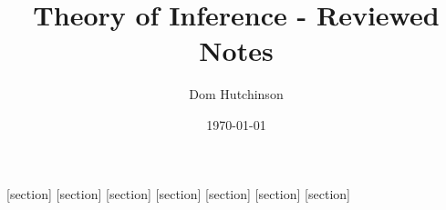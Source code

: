 \documentclass[11pt,a4paper]{article}
\begin{document}
\pagestyle{fancy}
\setlength\parindent{0pt}
\allowdisplaybreaks

\renewcommand{\headrulewidth}{0pt}

\renewcommand{\thefootnote}{[\arabic{footnote}]}


\title{Theory of Inference - Reviewed Notes}
\author{Dom Hutchinson}
\date{\today}
\maketitle

\fancyhead[R]{\today}

[section]
[section]
[section]
[section]
[section]
[section]
[section]

\newcommand{\dotprod}[0]{\boldsymbol{\cdot}}
\newcommand{\cosech}[0]{\mathrm{cosech}\ }
\newcommand{\cosec}[0]{\mathrm{cosec}\ }
\newcommand{\sech}[0]{\mathrm{sech}\ }
\newcommand{\prob}[0]{\mathbb{P}}
\newcommand{\nats}[0]{\mathbb{N}}
\newcommand{\cov}[0]{\mathrm{Cov}}
\newcommand{\var}[0]{\mathrm{Var}}
\newcommand{\expect}[0]{\mathbb{E}}
\newcommand{\reals}[0]{\mathbb{R}}
\newcommand{\integers}[0]{\mathbb{Z}}
\newcommand{\indicator}[0]{\mathds{1}}
\newcommand{\nb}[0]{\textit{N.B.} }
\newcommand{\ie}[0]{\textit{i.e.} }
\newcommand{\eg}[0]{\textit{e.g.} }
\newcommand{\X}[0]{\textbf{X}}
\newcommand{\x}[0]{\textbf{x}}
\newcommand{\iid}[0]{\overset{\text{iid}}{\sim}}
\newcommand{\proved}[0]{$\hfill\square$\\}
\newcommand{\argmin}[0]{\text{argmin}}
\newcommand{\argmax}[0]{\text{argmax}}
\end{document}
